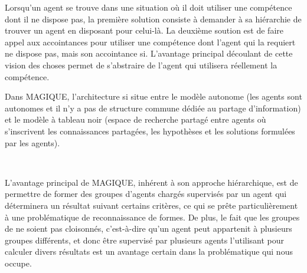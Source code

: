 Lorsqu'un agent se trouve dans une situation où il doit utiliser une compétence dont il ne dispose pas, la première solution consiste à demander à sa hiérarchie de trouver un agent en disposant pour celui-là. La deuxième soution est de faire appel aux accointances pour utiliser une compétence dont l'agent qui la requiert ne dispose pas, mais son accointance si. L'avantage principal découlant de cette vision des choses permet de s'abstraire de l'agent qui utilisera réellement la compétence.

Dans MAGIQUE, l'architecture si situe entre le modèle autonome (les agents sont autonomes et il n'y a pas de structure commune dédiée au partage d'information) et le modèle à tableau noir (espace de recherche partagé entre agents où s'inscrivent les connaissances partagées, les hypothèses et les solutions formulées par les agents).

~

L'avantage principal de MAGIQUE, inhérent à son approche hiérarchique, est de permettre de former des groupes d'agents chargés supervisés par un agent qui déterminera un résultat suivant certains critères, ce qui se prête particulièrement à une problématique de reconnaissance de formes. De plus, le fait que les groupes de ne soient pas cloisonnés, c'est-à-dire qu'un agent peut appartenit à plusieurs groupes différents, et donc être supervisé par plusieurs agents l'utilisant pour calculer divers résultats est un avantage certain dans la problématique qui nous occupe.